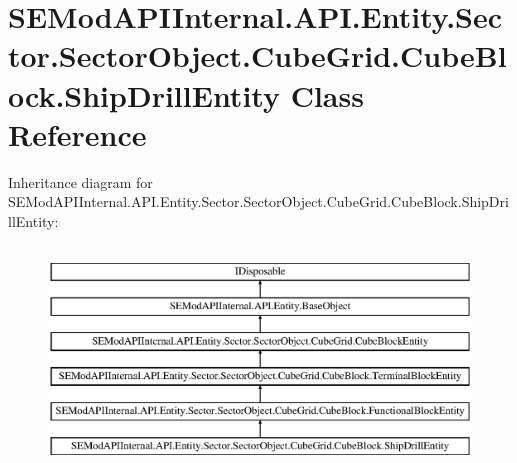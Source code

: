 \hypertarget{class_s_e_mod_a_p_i_internal_1_1_a_p_i_1_1_entity_1_1_sector_1_1_sector_object_1_1_cube_grid_1_1d51c0ecece4b059e03822a2f6c969595}{}\section{S\+E\+Mod\+A\+P\+I\+Internal.\+A\+P\+I.\+Entity.\+Sector.\+Sector\+Object.\+Cube\+Grid.\+Cube\+Block.\+Ship\+Drill\+Entity Class Reference}
\label{class_s_e_mod_a_p_i_internal_1_1_a_p_i_1_1_entity_1_1_sector_1_1_sector_object_1_1_cube_grid_1_1d51c0ecece4b059e03822a2f6c969595}
Inheritance diagram for S\+E\+Mod\+A\+P\+I\+Internal.\+A\+P\+I.\+Entity.\+Sector.\+Sector\+Object.\+Cube\+Grid.\+Cube\+Block.\+Ship\+Drill\+Entity\+:\begin{figure}[H]
\begin{center}
\leavevmode
\includegraphics[height=6.000000cm]{class_s_e_mod_a_p_i_internal_1_1_a_p_i_1_1_entity_1_1_sector_1_1_sector_object_1_1_cube_grid_1_1d51c0ecece4b059e03822a2f6c969595}
\end{center}
\end{figure}
